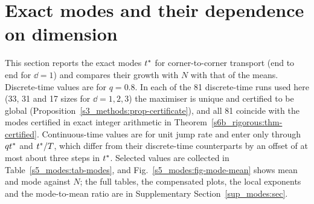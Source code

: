 \section{Exact modes and their dependence on dimension}\label{s5_modes:sec}

This section reports the exact modes $t^{*}$ for corner-to-corner transport (end to end for $\dd=1$) and compares
their growth with $N$ with that of the means. Discrete-time values are for $q=0.8$. In each of the 81 discrete-time
runs used here (33, 31 and 17 sizes for $\dd=1,2,3$) the maximiser is unique and certified to be global
(Proposition~\ref{s3_methods:prop-certificate}), and all 81 coincide with the modes certified in exact integer
arithmetic in Theorem~\ref{s6b_rigorous:thm-certified}. Continuous-time values are for unit jump rate and enter only
through $qt^{*}$ and $t^{*}/T$, which differ from their discrete-time counterparts by an offset of at most about
three steps in $t^{*}$.
Selected values are collected in Table~\ref{s5_modes:tab-modes}, and Fig.~\ref{s5_modes:fig-mode-mean} shows mean and
mode against $N$; the full tables, the compensated plots, the local exponents and the mode-to-mean ratio are in
Supplementary Section~\ref{sup_modes:sec}.

